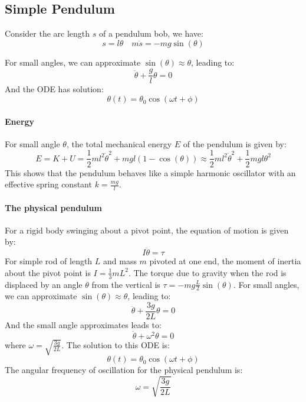 \documentclass[11pt]{report}
\begin{document}
\subsection{Simple Pendulum}
Consider the arc length \( s \) of a pendulum bob, we have:
\begin{equation}
    s = l\theta \quad m\ddot{s} = -mg\sin(\theta)
\end{equation}

For small angles, we can approximate \( \sin(\theta) \approx \theta \), leading to:
\begin{equation}
    \ddot{\theta} + \frac{g}{l}\theta = 0
\end{equation}
And the ODE has solution:
\begin{equation}
    \theta(t) = \theta_0 \cos(\omega t + \phi)
\end{equation}

\paragraph{Energy} For small angle $\theta$, the total mechanical energy \( E \) of the pendulum is given by:
\begin{equation}
    E = K + U = \frac{1}{2}ml^2\dot{\theta}^2 + mgl(1 - \cos(\theta)) \approx \frac{1}{2}ml^2\dot{\theta}^2 + \frac{1}{2}mgl\theta^2
\end{equation}
This shows that the pendulum behaves like a simple harmonic oscillator with an effective spring constant \( k = \frac{mg}{l} \).    


\paragraph{The physical pendulum} For a rigid body swinging about a pivot point, the equation of motion is given by:
\begin{equation}
    I\ddot{\theta} = \tau 
\end{equation}
For simple rod of length \( L \) and mass \( m \) pivoted at one end, the moment of inertia about the pivot point is \( I = \frac{1}{3}mL^2 \). The torque due to gravity when the rod is displaced by an angle \( \theta \) from the vertical is \( \tau = -mg\frac{L}{2}\sin(\theta) \). For small angles, we can approximate \( \sin(\theta) \approx \theta \), leading to:
\begin{equation}
    \ddot{\theta} + \frac{3g}{2L}\theta = 0
\end{equation}
And the small angle approximates leads to:
\begin{equation}
    \ddot{\theta} + \omega^2 \theta = 0
\end{equation}
where \( \omega = \sqrt{\frac{3g}{2L}} \). The solution to this ODE is:
\begin{equation}
    \theta(t) = \theta_0 \cos(\omega t + \phi)
\end{equation}
The angular frequency of oscillation for the physical pendulum is:
\begin{equation}
    \omega = \sqrt{\frac{3g}{2L}}
\end{equation}
\end{document}
